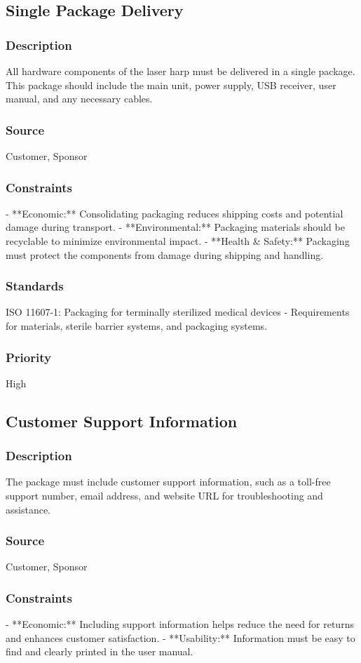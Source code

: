 \subsection{Single Package Delivery}
\subsubsection{Description}
All hardware components of the laser harp must be delivered in a single package. This package should include the main unit, power supply, USB receiver, user manual, and any necessary cables.
\subsubsection{Source}
Customer, Sponsor
\subsubsection{Constraints}
- **Economic:** Consolidating packaging reduces shipping costs and potential damage during transport.
- **Environmental:** Packaging materials should be recyclable to minimize environmental impact.
- **Health & Safety:** Packaging must protect the components from damage during shipping and handling.
\subsubsection{Standards}
ISO 11607-1: Packaging for terminally sterilized medical devices - Requirements for materials, sterile barrier systems, and packaging systems.
\subsubsection{Priority}
High


\subsection{Customer Support Information}
\subsubsection{Description}
The package must include customer support information, such as a toll-free support number, email address, and website URL for troubleshooting and assistance.
\subsubsection{Source}
Customer, Sponsor
\subsubsection{Constraints}
- **Economic:** Including support information helps reduce the need for returns and enhances customer satisfaction.
- **Usability:** Information must be easy to find and clearly printed in the user manual.
